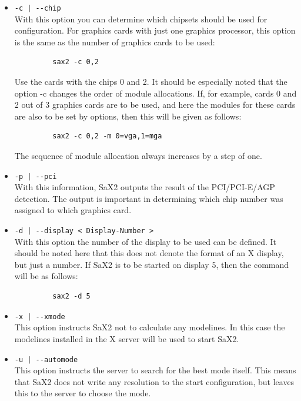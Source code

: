 \begin{itemize}
\item \verb+-c | --chip+\\
      With this option you can determine which chipsets should be used for
      configuration. For graphics cards with just one graphics processor,
      this option is the same as the number of graphics cards to be
      used:
      \begin{verbatim}
         sax2 -c 0,2
      \end{verbatim}
      Use the cards with the chips 0 and 2. It should be especially noted that
      the option -c changes the order of module allocations. If, for example,
      cards 0 and 2 out of 3 graphics cards are to be used, and here the
      modules for these cards are also to be set by options, then this will be
      given as follows: 
      \begin{verbatim} 
         sax2 -c 0,2 -m 0=vga,1=mga
      \end{verbatim}
      The sequence of module allocation always increases by a step of one.

\item \verb+-p | --pci+\\
      With this information, SaX2 outputs the result of the PCI/PCI-E/AGP
      detection. The output is important in determining which chip number
      was assigned to which graphics card.

\item \verb+-d | --display < Display-Number >+\\
      With this option the number of the display to be used can be defined. It
      should be noted here that this does not denote the format of an X
      display, but just a number. If SaX2 is to be started on display 5, then
      the command will be as follows:
      \begin{verbatim} 
         sax2 -d 5
      \end{verbatim} 
      
\item \verb+-x | --xmode+\\
      This option instructs SaX2 not to calculate any modelines. In 
      this case the modelines installed in the X server will be used to start
      SaX2.

\item \verb+-u | --automode+\\
      This option instructs the server to search for the best mode
      itself. This means that SaX2 does not write any resolution to the start
      configuration, but leaves this to the server to choose the mode.


\end{itemize}
